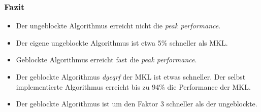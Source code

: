\begin{frame}
\frametitle{Fazit}
\begin{itemize}
	\item Der ungeblockte Algorithmus erreicht nicht die \textit{peak performance}.
	\item Der eigene ungeblockte Algorithmus ist etwa 5\% schneller als MKL.
	\item Geblockte Algorithmus erreicht fast die \textit{peak performance}.
	\item Der geblockte Algorithmus \textit{dgeqrf} der MKL ist etwas schneller. Der selbst implementierte Algorithmus erreicht bis zu 94\% die Performance der MKL.
	\item Der geblockte Algorithmus ist um den Faktor 3 schneller als der ungeblockte.
\end{itemize}
\end{frame}




